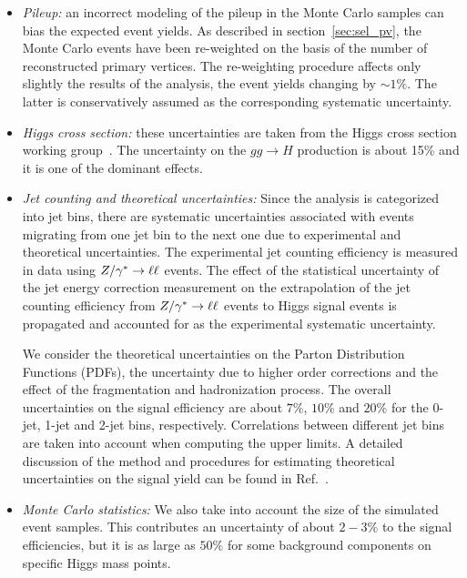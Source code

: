 \begin{itemize}
\item {\it Pileup:} an incorrect modeling of the pileup in the Monte Carlo samples 
can bias the expected event yields. As described in section~\ref{sec:sel_pv}, 
the Monte Carlo events have been re-weighted on the basis of the number of reconstructed
primary vertices. The re-weighting procedure affects only slightly the results of the analysis,
the event yields changing by $\sim1\%$. The latter is conservatively assumed as 
the corresponding systematic uncertainty. 

\item {\it Higgs cross section:} these uncertainties are taken from the Higgs cross
section working group~\cite{LHCHiggsCrossSectionWorkingGroup:2011ti}. The uncertainty 
on the $gg \to H$ production is about 15\% and it is one of the dominant effects.

\item {\it Jet counting and theoretical uncertainties:} 
Since the analysis is categorized into jet bins, there are systematic uncertainties
associated with events migrating from one jet bin to the next one due to 
experimental and theoretical uncertainties. The experimental jet counting efficiency is 
measured in data using $Z/\gamma^*\to\ell\ell$ events. The effect of the statistical uncertainty 
of the jet energy correction measurement on the extrapolation
of the jet counting efficiency from $Z/\gamma^*\to\ell\ell$ events to Higgs signal
events is propagated and accounted for as the experimental 
systematic uncertainty.

We consider the theoretical uncertainties on the Parton Distribution Functions (PDFs), 
the uncertainty due to higher order corrections and the effect of the fragmentation and 
hadronization process. The overall uncertainties on the signal efficiency are 
about $7\%$, $10\%$ and $20\%$ for the 0-jet, 1-jet and 2-jet bins, respectively.
Correlations between different jet bins are taken into account when computing
the upper limits. A detailed discussion of the method and procedures for estimating
theoretical uncertainties on the signal yield can be found in Ref.~\cite{HWW2011AN}. 

\item {\it Monte Carlo statistics:} We also take into account the 
size of the simulated event samples. 
This contributes an uncertainty of about $2-3\%$ to the signal
efficiencies, but it is as large as $50\%$ for some background components on specific
Higgs mass points.
\end{itemize}


